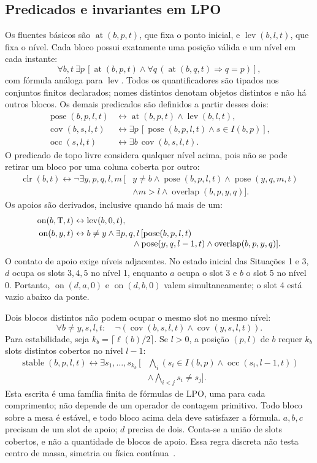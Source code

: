 \documentclass[11pt,a4paper]{article}
\newcommand{\at}{\operatorname{at}}
\newcommand{\lev}{\operatorname{lev}}
\newcommand{\clr}{\operatorname{clr}}
\newcommand{\On}{\operatorname{on}}
\newcommand{\cov}{\operatorname{cov}}
\newcommand{\occ}{\operatorname{occ}}
\newcommand{\pose}{\operatorname{pose}}
\newcommand{\stable}{\operatorname{stable}}
\newcommand{\Ov}{\operatorname{overlap}}
\newcommand{\T}{\mathrm{T}}
\begin{document}
\subsection{Predicados e invariantes em LPO}
Os fluentes básicos são $\at(b,p,t)$, que fixa o ponto inicial, e $\lev(b,l,t)$, que fixa o nível. Cada bloco possui exatamente uma posição válida e um nível em cada instante:
\[
\forall b,t\ \exists p\,[\at(b,p,t)\land\forall q\,(\at(b,q,t)\Rightarrow q=p)],
\]
com fórmula análoga para $\lev$. Todos os quantificadores são tipados nos conjuntos finitos declarados; nomes distintos denotam objetos distintos e não há outros blocos. Os demais predicados são definidos a partir desses dois:
\begin{align}
\pose(b,p,l,t)&\leftrightarrow\at(b,p,t)\land\lev(b,l,t),\\
\cov(b,s,l,t)&\leftrightarrow\exists p\,[\pose(b,p,l,t)\land s\in I(b,p)],\\
\occ(s,l,t)&\leftrightarrow\exists b\,\cov(b,s,l,t).
\end{align}
O predicado de topo livre considera qualquer nível acima, pois não se pode retirar um bloco por uma coluna coberta por outro:
\begin{align}
\clr(b,t)\leftrightarrow\neg\exists y,p,q,l,m\,[&y\neq b\land\pose(b,p,l,t)\land\pose(y,q,m,t)\nonumber\\[-3pt]
 &\land m>l\land\Ov(b,p,y,q)].
\end{align}
Os apoios são derivados, inclusive quando há mais de um:
\begin{align}
\On(b,\T,t)&\leftrightarrow\lev(b,0,t),\\
\On(b,y,t)&\leftrightarrow b\neq y\land\exists p,q,l\,[\pose(b,p,l,t)\nonumber\\[-3pt]
 &\hspace{24mm}\land\pose(y,q,l-1,t)\land\Ov(b,p,y,q)].
\end{align}
O contato de apoio exige níveis adjacentes. No estado inicial das Situações 1 e 3, $d$ ocupa os slots $3,4,5$ no nível 1, enquanto $a$ ocupa o slot 3 e $b$ o slot 5 no nível 0. Portanto, $\On(d,a,0)$ e $\On(d,b,0)$ valem simultaneamente; o slot 4 está vazio abaixo da ponte.

Dois blocos distintos não podem ocupar o mesmo slot no mesmo nível:
\[
\forall b\neq y,s,l,t:\quad\neg(\cov(b,s,l,t)\land\cov(y,s,l,t)).
\]
Para estabilidade, seja $k_b=\lceil\ell(b)/2\rceil$. Se $l>0$, a posição $(p,l)$ de $b$ requer $k_b$ slots distintos cobertos no nível $l-1$:
\begin{align}
\stable(b,p,l,t)\leftrightarrow\exists s_1,\ldots,s_{k_b}\,[&\bigwedge_i(s_i\in I(b,p)\land\occ(s_i,l-1,t))\nonumber\\[-3pt]
 &\land\bigwedge_{i<j}s_i\neq s_j].
\end{align}
Esta escrita é uma família finita de fórmulas de LPO, uma para cada comprimento; não depende de um operador de contagem primitivo. Todo bloco sobre a mesa é estável, e todo bloco acima dela deve satisfazer a fórmula. $a,b,c$ precisam de um slot de apoio; $d$ precisa de dois. Conta-se a união de slots cobertos, e não a quantidade de blocos de apoio. Essa regra discreta não testa centro de massa, simetria ou física contínua~\cite{manual}.
\end{document}
